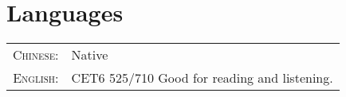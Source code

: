 \documentclass[a4paper,10pt]{article} %
\begin{document}
\begin{tabular}{r|p{11cm}}
\end{tabular}








\section{Languages}

\begin{tabular}{rl}
\textsc{Chinese: } & Native\\
\textsc{English: } & CET6 525/710 Good for reading and listening.\\



\end{tabular}
\end{document}
